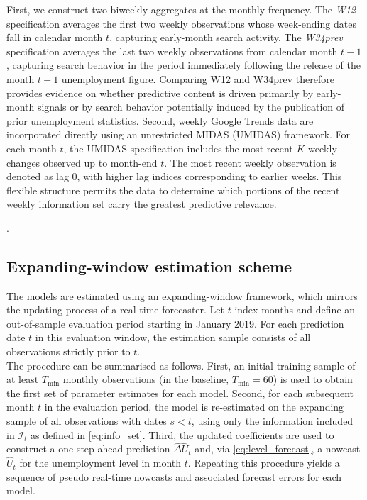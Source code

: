 \documentclass[12pt,a4paper]{article}
\begin{document}
First, we construct two biweekly aggregates at the monthly frequency.
The \textit{W12} specification averages the first two weekly observations whose week-ending dates fall in calendar month $t$,
capturing early-month search activity.
The \textit{W34prev} specification averages the last two weekly observations from calendar month $t-1$,
capturing search behavior in the period immediately following the release of the month $t-1$ unemployment figure.
Comparing W12 and W34prev therefore provides evidence on whether predictive content is driven primarily by early-month signals
or by search behavior potentially induced by the publication of prior unemployment statistics.
Second, weekly Google Trends data are incorporated directly using an unrestricted MIDAS (UMIDAS) framework.
For each month $t$, the UMIDAS specification includes the most recent $K$ weekly changes observed up to month-end $t$.
The most recent weekly observation is denoted as lag 0, with higher lag indices corresponding to earlier weeks.
This flexible structure permits the data to determine which portions of the recent weekly information set carry the greatest predictive relevance.








.
\subsection{Expanding-window estimation scheme}
The models are estimated using an expanding-window framework, which mirrors the updating process of a real-time forecaster. Let $t$ index months and define an out-of-sample evaluation period starting in January 2019. For each prediction date $t$ in this evaluation window, the estimation sample consists of all observations strictly prior to $t$.\\
The procedure can be summarised as follows. First, an initial training sample of at least $T_{\min}$ monthly observations (in the baseline, $T_{\min} = 60$) is used to obtain the first set of parameter estimates for each model. Second, for each subsequent month $t$ in the evaluation period, the model is re-estimated on the expanding sample of all observations with dates $s < t$, using only the information included in $\mathcal{I}_t$ as defined in \eqref{eq:info_set}. Third, the updated coefficients are used to construct a one-step-ahead prediction $\widehat{\Delta U}_t$ and, via \eqref{eq:level_forecast}, a nowcast $\widehat{U}_t$ for the unemployment level in month $t$.
Repeating this procedure yields a sequence of pseudo real-time nowcasts and associated forecast errors for each model. 
\end{document}
